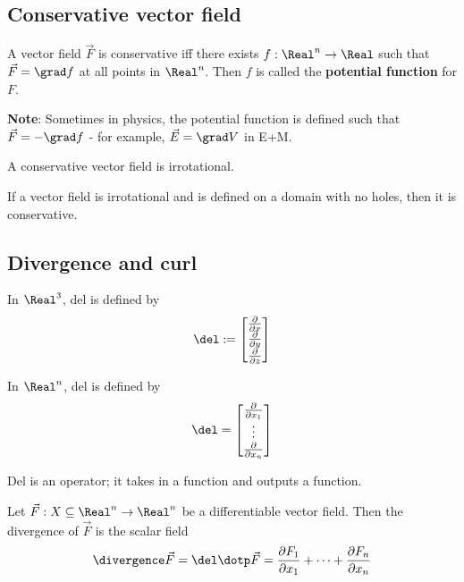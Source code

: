 \subsection{Conservative vector field}

\begin{definition}
  A vector field $\vec{F}$ is conservative iff there exists $f : \Real^n \to \Real$ such that $\vec{F} = \grad f$ at all points in $\Real^n$. Then $f$ is called the \textbf{potential function} for $F$.
\end{definition}

\textbf{Note}: Sometimes in physics, the potential function is defined such that $\vec{F} = - \grad f$ - for example, $\vec{E} = \grad V$ in E+M.

\begin{lemma}
  A conservative vector field is irrotational.

  If a vector field is irrotational and is defined on a domain with no holes, then it is conservative.
\end{lemma}

\subsection{Divergence and curl}

\begin{definition}
  In $\Real^3$, del is defined by 
  \[
    \del := \begin{bmatrix}
      \frac{\partial}{\partial x} \\
      \frac{\partial}{\partial y} \\
      \frac{\partial}{\partial z}
    \end{bmatrix}
  \]

  In $\Real^n$, del is defined by
  \[
    \del = \begin{bmatrix}
      \frac{\partial}{\partial x_1} \\
      \vdots \\
      \frac{\partial}{\partial x_n}
    \end{bmatrix}
  \]

  Del is an operator; it takes in a function and outputs a function.
\end{definition}

\begin{definition}[Divergence]
  Let $\vec{F} : X \subseteq \Real^n \to \Real^n$ be a differentiable vector field. Then the divergence of $\vec{F}$ is the scalar field
  \[
    \divergence \vec{F} = \del \dotp \vec{F} = \frac{\partial F_1}{\partial x_1} + \cdots + \frac{\partial F_n}{\partial x_n}
  \]
\end{definition}

